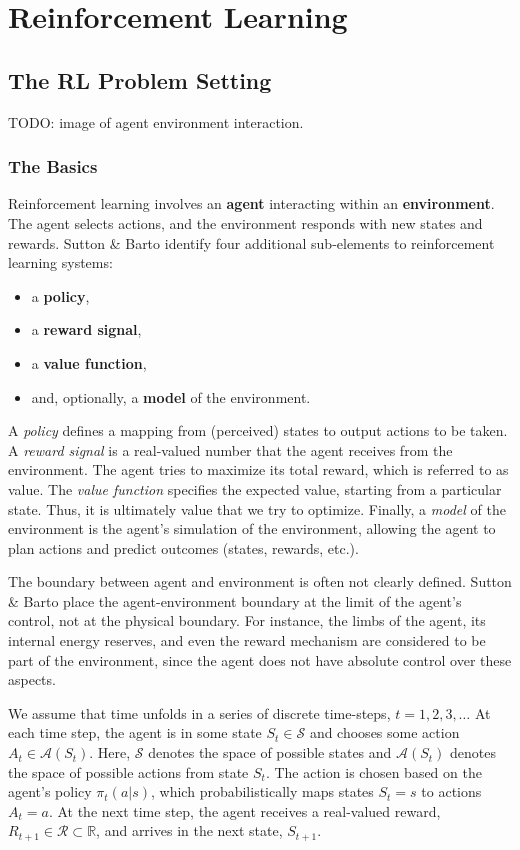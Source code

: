 \chapter{Reinforcement Learning}

\section{The RL Problem Setting}

TODO: image of agent environment interaction.

\subsection{The Basics}

Reinforcement learning involves an \textbf{agent} interacting within an \textbf{environment}. The agent selects actions, and the environment responds with new states and rewards. Sutton \& Barto \cite{sutton1998reinforcement} identify four additional sub-elements to reinforcement learning systems:
\begin{itemize}
	\item a \textbf{policy},
	\item a \textbf{reward signal},
	\item a \textbf{value function},
	\item and, optionally, a \textbf{model} of the environment.
\end{itemize}
\noindent A \textit{policy} defines a mapping from (perceived) states to output actions to be taken. A \textit{reward signal} is a real-valued number that the agent receives from the environment. The agent tries to maximize its total reward, which is referred to as value. The \textit{value function} specifies the expected value, starting from a particular state. Thus, it is ultimately value that we try to optimize. Finally, a \textit{model} of the environment is the agent's simulation of the environment, allowing the agent to plan actions and predict outcomes (states, rewards, etc.).

The boundary between agent and environment is often not clearly defined. Sutton \& Barto place the agent-environment boundary at the limit of the agent's control, not at the physical boundary. For instance, the limbs of the agent, its internal energy reserves, and even the reward mechanism are considered to be part of the environment, since the agent does not have absolute control over these aspects.

We assume that time unfolds in a series of discrete time-steps, $t = 1, 2, 3, \dots$ At each time step, the agent is in some state $S_t \in \mathcal{S}$ and chooses some action $A_t \in \mathcal{A} (S_t)$. Here, $\mathcal{S}$ denotes the space of possible states and $\mathcal{A} (S_t)$ denotes the space of possible actions from state $S_t$. The action is chosen based on the agent's policy $\pi_t (a | s)$, which probabilistically maps states $S_t = s$ to actions $A_t = a$. At the next time step, the agent receives a real-valued reward, $R_{t+1} \in \mathcal{R} \subset \mathbb{R}$, and arrives in the next state, $S_{t+1}$.

